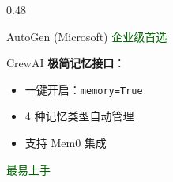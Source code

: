 \documentclass[aspectratio=169,10pt]{beamer}
\begin{document}
\begin{frame}
\begin{columns}[T]
\begin{column}{0.48\textwidth}
\begin{block}{AutoGen (Microsoft)}
        \textcolor{darkgreen}{企业级首选}
      \end{block}

      \vspace{0.2cm}

      \begin{block}{CrewAI}
        \footnotesize
        \textbf{极简记忆接口}：
        \begin{itemize}
          \item 一键开启：\texttt{memory=True}
          \item 4 种记忆类型自动管理
          \item 支持 Mem0 集成
        \end{itemize}

        \textcolor{darkgreen}{最易上手}
      \end{block}
    \end{column}
  \end{columns}
\end{frame}
\end{document}
